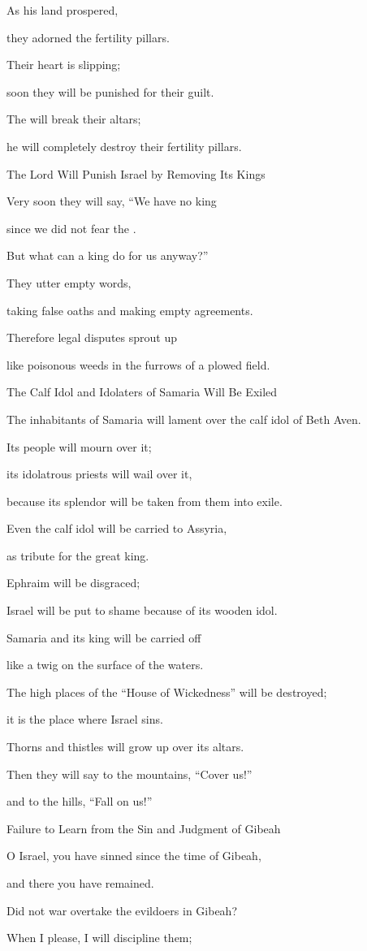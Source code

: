 {\par }{\Q As his land
prospered,
\par }{\Q they adorned
the fertility pillars.
\par }{\Q {}Their heart
is slipping;
\par }{\Q soon they will be punished
for their guilt.
\par }{\Q The
{} will break
their altars;
\par }{\Q he will completely destroy
their fertility pillars.
\par }{\SH The Lord Will Punish Israel by Removing Its Kings
\par }{\Q {}Very soon
they will say,
“We have no
king
\par }{\Q since
we did not
fear
the {}.
\par }{\Q But what can
a king
do
for us anyway?”
\par }{\Q {}They utter
empty words,
\par }{\Q taking false
oaths
and making
empty agreements.
\par }{\Q Therefore legal disputes
sprout up
\par }{\Q like poisonous weeds
in
the furrows
of a plowed field.
\par }{\SH The Calf Idol and Idolaters of Samaria Will Be Exiled
\par }{\Q {}The inhabitants
of Samaria
will lament
over the calf
idol of Beth Aven.
\par }{\Q Its people
will mourn
over
it;
\par }{\Q its idolatrous priests
will wail
over
it,

\par }{\Q because
its splendor
will be taken from
them into exile.
\par }{\Q {}Even
the calf idol will be carried
to Assyria,
\par }{\Q as tribute
for the great king.
\par }{\Q Ephraim
will be disgraced;
\par }{\Q Israel
will be put
to shame
because of its wooden idol.
\par }{\Q {}Samaria
and its
king
will be carried
off
\par }{\Q like
a twig
on
the surface
of the waters.
\par }{\Q {}The high places
of the “House of Wickedness”
will be destroyed;
\par }{\Q it is the place where Israel
sins.
\par }{\Q Thorns
and thistles
will grow up
over
its altars.
\par }{\Q Then they will say
to the mountains,
“Cover
us!”
\par }{\Q and to the hills,
“Fall on us!”
\par }{\SH Failure to Learn from the Sin and Judgment of Gibeah
\par }{\Q {}O Israel,
you have sinned
since the time
of Gibeah,
\par }{\Q and there
you have remained.
\par }{\Q Did not
war
overtake
the evildoers
in Gibeah?
\par }{\Q {}When I please,
I will discipline
them;

}
